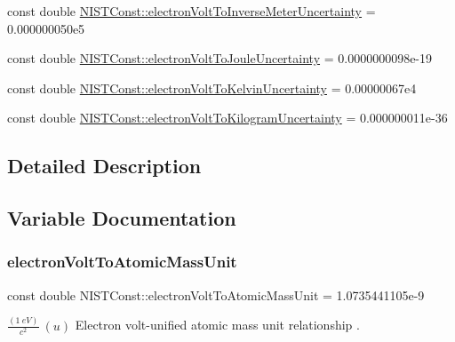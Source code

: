 \begin{DoxyCompactItemize}
\item 
const double \hyperlink{group___n_i_s_t_const-_electron_volt_gab410911d31f242cb940fe960d19b1ddb}{N\+I\+S\+T\+Const\+::electron\+Volt\+To\+Inverse\+Meter\+Uncertainty} = 0.\+000000050e5
\item 
const double \hyperlink{group___n_i_s_t_const-_electron_volt_ga32594652a8bac45e8676551612471385}{N\+I\+S\+T\+Const\+::electron\+Volt\+To\+Joule\+Uncertainty} = 0.\+0000000098e-\/19
\item 
const double \hyperlink{group___n_i_s_t_const-_electron_volt_ga6754c9f090abf4bff80621978bf85eb1}{N\+I\+S\+T\+Const\+::electron\+Volt\+To\+Kelvin\+Uncertainty} = 0.\+00000067e4
\item 
const double \hyperlink{group___n_i_s_t_const-_electron_volt_ga77aec1f5b68dd74739fe268fa4362a85}{N\+I\+S\+T\+Const\+::electron\+Volt\+To\+Kilogram\+Uncertainty} = 0.\+000000011e-\/36
\end{DoxyCompactItemize}


\subsection{Detailed Description}


\subsection{Variable Documentation}
\mbox{\label{group___n_i_s_t_const-_electron_volt_gabd56c1195e7ce2bb9c314e88b43e30ab}} 
\subsubsection{\texorpdfstring{electron\+Volt\+To\+Atomic\+Mass\+Unit}{electronVoltToAtomicMassUnit}}
{\footnotesize\ttfamily const double N\+I\+S\+T\+Const\+::electron\+Volt\+To\+Atomic\+Mass\+Unit = 1.\+0735441105e-\/9}

$\frac{(1\ eV)}{c^2}\ (u)$ Electron volt-\/unified atomic mass unit relationship . \mbox{\label{group___n_i_s_t_const-_electron_volt_ga0f93985ef9b7a71e0c1e6172d6d041a5}} 
